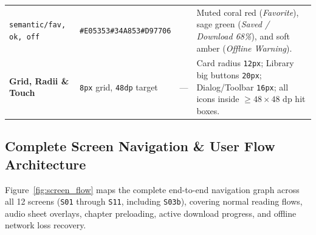 \begin{table}[H]
\begin{tabularx}{\textwidth}{L{3.2cm} C{2.3cm} C{1.8cm} Y}
\texttt{semantic/fav, ok, off} & \texttt{\#E05353}\newline \texttt{\#34A853}\newline \texttt{\#D97706} &  & Muted coral red (\textit{Favorite}), sage green (\textit{Saved / Download 68\%}), and soft amber (\textit{Offline Warning}). \\
\textbf{Grid, Radii \& Touch} & \texttt{8px} grid, \texttt{48dp} target & --- & Card radius \texttt{12px}; Library big buttons \texttt{20px}; Dialog/Toolbar \texttt{16px}; all icons inside $\ge 48 \times 48\text{ dp}$ hit boxes. \\
\bottomrule
\end{tabularx}
\end{table}

\subsection{Complete Screen Navigation \& User Flow Architecture}
\label{subsec:user_flow}

Figure~\ref{fig:screen_flow} maps the complete end-to-end navigation graph across all 12 screens (\texttt{S01} through \texttt{S11}, including \texttt{S03b}), covering normal reading flows, audio sheet overlays, chapter preloading, active download progress, and offline network loss recovery.

